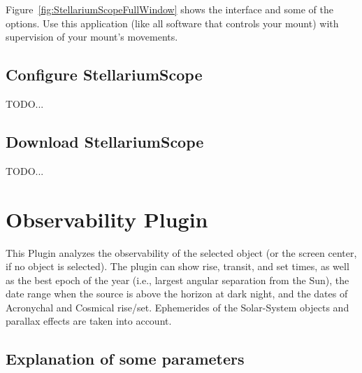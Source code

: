 Figure~\ref{fig:StellariumScopeFullWindow} shows the interface and
some of the options.  Use this application (like all software that
controls your mount) with supervision of your mount's movements.

\subsection{Configure StellariumScope}
\label{sec:plugins:StellariumScope:configure}
TODO...
\subsection{Download StellariumScope}
TODO...

\newpage
\section{Observability Plugin}
\label{sec:plugins:Observability}

This Plugin  analyzes the observability of the selected object (or the
screen center, if no object is selected). The plugin can show rise,
transit, and set times, as well as the best epoch of the year (i.e.,
largest angular separation from the Sun), the date range when the
source is above the horizon at dark night, and the dates of Acronychal
and Cosmical rise/set.  Ephemerides of the Solar-System objects and
parallax effects are taken into account.

\subsection*{Explanation of some parameters}

